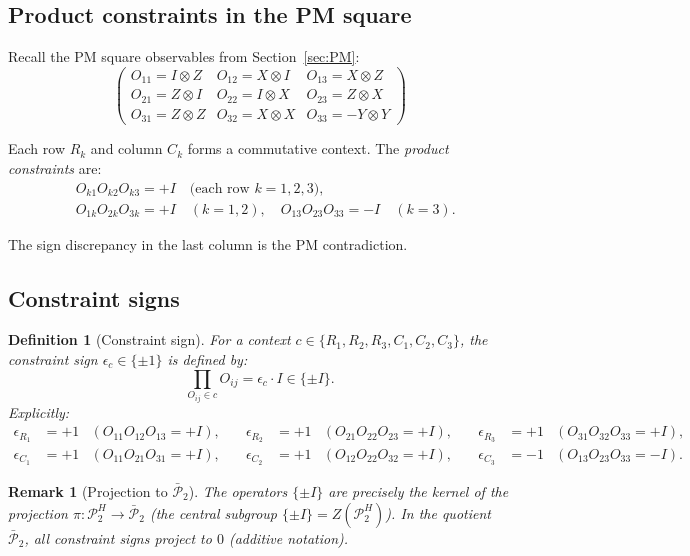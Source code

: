 \documentclass[11pt]{article}
\newtheorem{definition}[theorem]{Definition}
\newtheorem{remark}[theorem]{Remark}
\begin{document}
\subsection{Product constraints in the PM square}

Recall the PM square observables from Section~\ref{sec:PM}:
\[
\begin{pmatrix}
O_{11}=I{\otimes}Z & O_{12}=X{\otimes}I & O_{13}=X{\otimes}Z \\
O_{21}=Z{\otimes}I & O_{22}=I{\otimes}X & O_{23}=Z{\otimes}X \\
O_{31}=Z{\otimes}Z & O_{32}=X{\otimes}X & O_{33}=-Y{\otimes}Y
\end{pmatrix}
\]

Each row $R_k$ and column $C_k$ forms a commutative context. The
\emph{product constraints} are:
\begin{align}
\label{eq:row-constraints}
&O_{k1} O_{k2} O_{k3} = +I \quad\text{(each row $k=1,2,3$)}, \\
\label{eq:col-constraints}
&O_{1k} O_{2k} O_{3k} = +I \quad (k=1,2),\quad
O_{13} O_{23} O_{33} = -I \quad (k=3).
\end{align}

The sign discrepancy in the last column is the PM contradiction.

\subsection{Constraint signs}

\begin{definition}[Constraint sign]
\label{def:constraint-sign}
For a context $c \in \{R_1, R_2, R_3, C_1, C_2, C_3\}$, the
\emph{constraint sign} $\epsilon_c \in \{\pm 1\}$ is defined by:
\begin{equation}
\label{eq:epsilon-c}
\prod_{O_{ij} \in c} O_{ij} = \epsilon_c \cdot I \in \{\pm I\}.
\end{equation}
Explicitly:
\begin{align*}
\epsilon_{R_1} &= +1 &(O_{11} O_{12} O_{13} = +I), &\quad
\epsilon_{R_2} &= +1 &(O_{21} O_{22} O_{23} = +I), &\quad
\epsilon_{R_3} &= +1 &(O_{31} O_{32} O_{33} = +I), \\
\epsilon_{C_1} &= +1 &(O_{11} O_{21} O_{31} = +I), &\quad
\epsilon_{C_2} &= +1 &(O_{12} O_{22} O_{32} = +I), &\quad
\epsilon_{C_3} &= -1 &(O_{13} O_{23} O_{33} = -I).
\end{align*}
\end{definition}

\begin{remark}[Projection to $\bar{\mathcal{P}}_2$]
The operators $\{\pm I\}$ are precisely the kernel of the projection
$\pi: \mathcal{P}_2^H \to \bar{\mathcal{P}}_2$ (the central
subgroup $\{\pm I\} = Z(\mathcal{P}_2^H)$).
In the quotient $\bar{\mathcal{P}}_2$, all constraint signs project
to $0$ (additive notation).
\end{remark}
\end{document}
